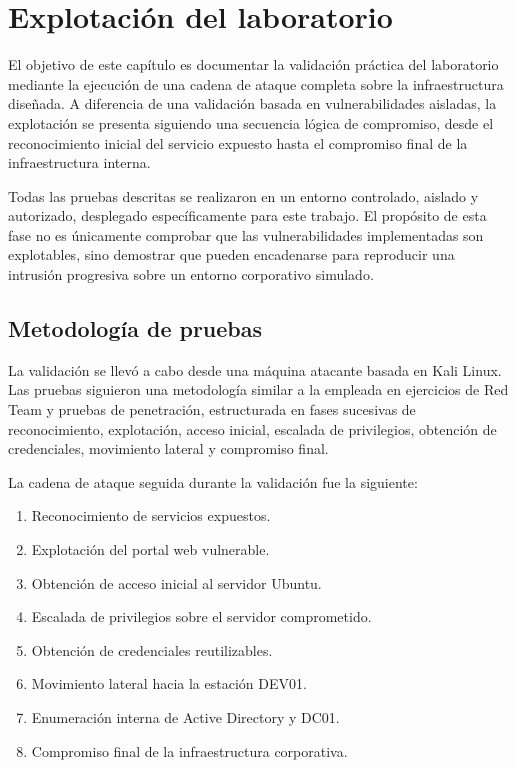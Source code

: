 \vspace*{-0.75cm}


\section{Explotación del laboratorio}
\label{sec:explotacion_del_laboratorio}
\vspace{0.7cm}


El objetivo de este capítulo es documentar la validación práctica del laboratorio mediante la ejecución de una cadena de ataque completa sobre la infraestructura diseñada. A diferencia de una validación basada en vulnerabilidades aisladas, la explotación se presenta siguiendo una secuencia lógica de compromiso, desde el reconocimiento inicial del servicio expuesto hasta el compromiso final de la infraestructura interna.

Todas las pruebas descritas se realizaron en un entorno controlado, aislado y autorizado, desplegado específicamente para este trabajo. El propósito de esta fase no es únicamente comprobar que las vulnerabilidades implementadas son explotables, sino demostrar que pueden encadenarse para reproducir una intrusión progresiva sobre un entorno corporativo simulado.


\subsection{Metodología de pruebas}

La validación se llevó a cabo desde una máquina atacante basada en Kali Linux. Las pruebas siguieron una metodología similar a la empleada en ejercicios de Red Team y pruebas de penetración, estructurada en fases sucesivas de reconocimiento, explotación, acceso inicial, escalada de privilegios, obtención de credenciales, movimiento lateral y compromiso final.

La cadena de ataque seguida durante la validación fue la siguiente:

\begin{enumerate}
    \item Reconocimiento de servicios expuestos.
    \item Explotación del portal web vulnerable.
    \item Obtención de acceso inicial al servidor Ubuntu.
    \item Escalada de privilegios sobre el servidor comprometido.
    \item Obtención de credenciales reutilizables.
    \item Movimiento lateral hacia la estación DEV01.
    \item Enumeración interna de Active Directory y DC01.
    \item Compromiso final de la infraestructura corporativa.
\end{enumerate}

